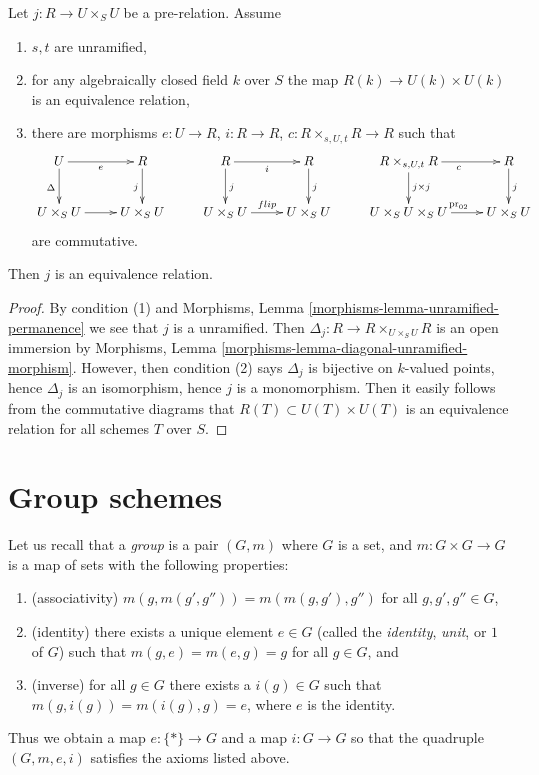 \begin{lemma}
\label{lemma-etale-equivalence-relation}
Let $j : R \to U \times_S U$ be a pre-relation. Assume
\begin{enumerate}
\item $s, t$ are unramified,
\item for any algebraically closed field $k$ over $S$
the map $R(k) \to U(k) \times U(k)$ is an equivalence relation,
\item there are morphisms $e : U \to R$, $i : R \to R$,
$c : R \times_{s, U, t} R \to R$ such that
$$
\xymatrix{
U \ar[r]_e \ar[d]_\Delta &
R \ar[d]_j &
R \ar[d]^j \ar[r]_i &
R \ar[d]^j &
R \times_{s, U, t} R \ar[d]^{j \times j} \ar[r]_c &
R \ar[d]^j \\
U \times_S U \ar[r] &
U \times_S U &
U \times_S U \ar[r]^{flip} &
U \times_S U &
U \times_S U \times_S U \ar[r]^{\text{pr}_{02}} &
U \times_S U
}
$$
are commutative.
\end{enumerate}
Then $j$ is an equivalence relation.
\end{lemma}

\begin{proof}
By condition (1) and
Morphisms, Lemma \ref{morphisms-lemma-unramified-permanence}
we see that $j$ is a unramified. Then
$\Delta_j : R \to R \times_{U \times_S U} R$ is an open immersion by
Morphisms, Lemma \ref{morphisms-lemma-diagonal-unramified-morphism}.
However, then condition (2) says $\Delta_j$ is bijective on
$k$-valued points, hence $\Delta_j$ is an isomorphism, hence $j$
is a monomorphism. Then it easily follows from the commutative
diagrams that $R(T) \subset U(T) \times U(T)$ is an equivalence
relation for all schemes $T$ over $S$.
\end{proof}













\section{Group schemes}
\label{section-group-schemes}

\noindent
Let us recall that a {\it group} is a pair
$(G, m)$ where $G$ is a set, and $m : G \times G \to G$ is
a map of sets with the following properties:
\begin{enumerate}
\item (associativity) $m(g, m(g', g'')) = m(m(g, g'), g'')$
for all $g, g', g'' \in G$,
\item (identity) there exists a unique element $e \in G$
(called the {\it identity}, {\it unit}, or $1$ of $G$) such that
$m(g, e) = m(e, g) = g$ for all $g \in G$, and
\item (inverse) for all $g \in G$ there exists a $i(g) \in G$
such that $m(g, i(g)) = m(i(g), g) = e$, where $e$ is the
identity.
\end{enumerate}
Thus we obtain a map $e : \{*\} \to G$ and a map
$i : G \to G$ so that the quadruple $(G, m, e, i)$
satisfies the axioms listed above.

